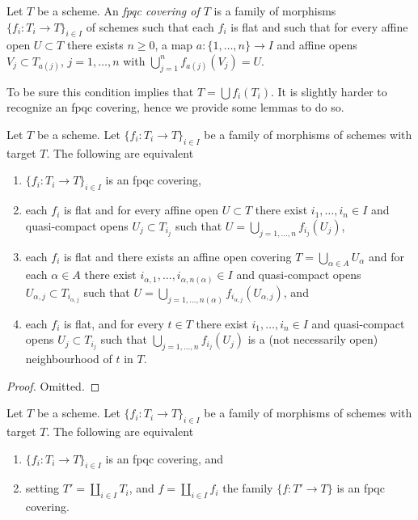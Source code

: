\begin{definition}
\label{definition-fpqc-covering}
Let $T$ be a scheme. An {\it fpqc covering of $T$} is a family
of morphisms $\{f_i : T_i \to T\}_{i \in I}$ of schemes
such that each $f_i$ is flat and such that for every affine open
$U \subset T$ there exists $n \geq 0$, a map
$a : \{1, \ldots, n\} \to I$ and affine opens
$V_j \subset T_{a(j)}$, $j = 1, \ldots, n$
with $\bigcup_{j = 1}^n f_{a(j)}(V_j) = U$.
\end{definition}

\noindent
To be sure this condition implies that $T = \bigcup f_i(T_i)$.
It is slightly harder to recognize an fpqc covering, hence we provide
some lemmas to do so.

\begin{lemma}
\label{lemma-recognize-fpqc-covering}
Let $T$ be a scheme. Let $\{f_i : T_i \to T\}_{i \in I}$ be a family of
morphisms of schemes with target $T$. The following are equivalent
\begin{enumerate}
\item $\{f_i : T_i \to T\}_{i \in I}$ is an fpqc covering,
\item each $f_i$ is flat and for every affine open $U \subset T$
there exist $i_1, \ldots, i_n \in I$ and quasi-compact opens
$U_j \subset T_{i_j}$ such that $U = \bigcup_{j = 1, \ldots, n} f_{i_j}(U_j)$,
\item each $f_i$ is flat and there exists an affine open covering
$T = \bigcup_{\alpha \in A} U_\alpha$ and for each $\alpha \in A$
there exist $i_{\alpha, 1}, \ldots, i_{\alpha, n(\alpha)} \in I$
and quasi-compact opens $U_{\alpha, j} \subset T_{i_{\alpha, j}}$ such that
$U = \bigcup_{j = 1, \ldots, n(\alpha)} f_{i_{\alpha, j}}(U_{\alpha, j})$, and
\item each $f_i$ is flat, and for every $t \in T$ there exist
$i_1, \ldots, i_n \in I$ and quasi-compact opens $U_j \subset T_{i_j}$
such that $\bigcup_{j = 1, \ldots, n} f_{i_j}(U_j)$ is a
(not necessarily open) neighbourhood of $t$ in $T$.
\end{enumerate}
\end{lemma}

\begin{proof}
Omitted.
\end{proof}

\begin{lemma}
\label{lemma-disjoint-union-is-fpqc-covering}
Let $T$ be a scheme. Let $\{f_i : T_i \to T\}_{i \in I}$ be a family of
morphisms of schemes with target $T$. The following are equivalent
\begin{enumerate}
\item $\{f_i : T_i \to T\}_{i \in I}$ is an fpqc covering, and
\item setting $T' = \coprod_{i \in I} T_i$, and $f = \coprod_{i \in I} f_i$
the family $\{f : T' \to T\}$ is an fpqc covering.
\end{enumerate}
\end{lemma}

